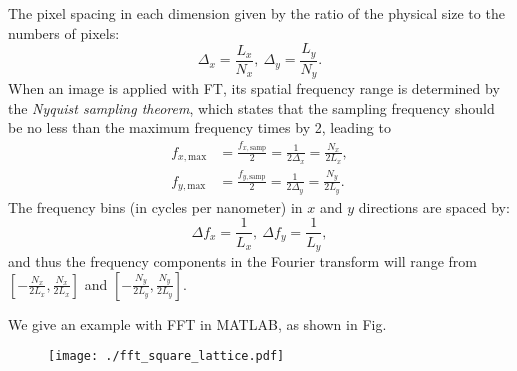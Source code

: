 \documentclass[pra,superscriptaddress,reprint,a4paper]{revtex4-1}
\begin{document}
The pixel spacing in each dimension given by the ratio of the physical size to the numbers of pixels:
\begin{equation}
\Delta_x = \frac{L_x}{N_x},~\Delta_y = \frac{L_y}{N_y}.
\end{equation}
When  an image is applied with FT, its spatial frequency range is determined by the \textit{Nyquist sampling theorem},
which states that the sampling frequency should be no less than the maximum frequency times by 2, leading to
\begin{subequations}
\begin{align}
f_{x,\text{max}} &= \frac{f_{x,\text{samp}}}{2} = \frac{1}{2\Delta_x} = \frac{N_x}{2L_x}, \\
f_{y,\text{max}} &= \frac{f_{y,\text{samp}}}{2} = \frac{1}{2\Delta_y} = \frac{N_y}{2L_y}.
\end{align}
\end{subequations}
The frequency bins (in cycles per nanometer) in $x$ and $y$ directions are spaced by:
\begin{equation}
\Delta f_x = \frac{1}{L_x},~\Delta f_y = \frac{1}{L_y},
\end{equation}
and thus the frequency components in the Fourier transform will range from 
$[-\frac{N_x}{2L_x}, \frac{N_x}{2L_x}]$ and $[-\frac{N_y}{2L_y}, \frac{N_y}{2L_y}]$.

We give an example with FFT in MATLAB, as shown in Fig.

\begin{figure}[t]
\centering
\texttt{[image: ./fft\_square\_lattice.pdf]}\\
\caption{\label{fig:square_lattice}}
\end{figure}
\end{document}
